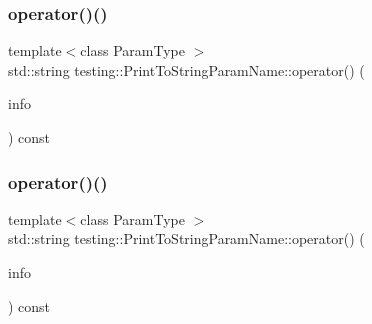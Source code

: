 \subsubsection{\texorpdfstring{operator()()}{operator()()}\hspace{0.1cm}{\footnotesize\ttfamily [1/3]}}
{\footnotesize\ttfamily template$<$class Param\+Type $>$ \\
std\+::string testing\+::\+Print\+To\+String\+Param\+Name\+::operator() (\begin{DoxyParamCaption}\item[{const \mbox{\hyperlink{structtesting_1_1_test_param_info}{Test\+Param\+Info}}$<$ Param\+Type $>$ \&}]{info }\end{DoxyParamCaption}) const\hspace{0.3cm}{\ttfamily [inline]}}

\mbox{\label{structtesting_1_1_print_to_string_param_name_a05b411cfb75dadb2c3c0355aee1dcf21}} 
\subsubsection{\texorpdfstring{operator()()}{operator()()}\hspace{0.1cm}{\footnotesize\ttfamily [2/3]}}
{\footnotesize\ttfamily template$<$class Param\+Type $>$ \\
std\+::string testing\+::\+Print\+To\+String\+Param\+Name\+::operator() (\begin{DoxyParamCaption}\item[{const \mbox{\hyperlink{structtesting_1_1_test_param_info}{Test\+Param\+Info}}$<$ Param\+Type $>$ \&}]{info }\end{DoxyParamCaption}) const\hspace{0.3cm}{\ttfamily [inline]}}

\mbox{\label{structtesting_1_1_print_to_string_param_name_a05b411cfb75dadb2c3c0355aee1dcf21}} 
